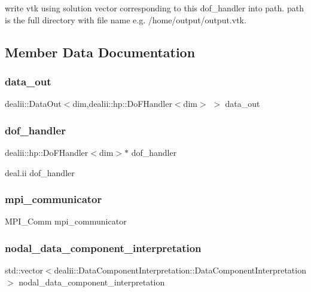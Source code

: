 write vtk using solution vector corresponding to this dof\+\_\+handler into path. path is the full directory with file name e.\+g. \textquotesingle{}/home/output/output.vtk\textquotesingle{}. 

\subsection{Member Data Documentation}
\mbox{\label{class_f_e_mdata_ab8d2ee01f13a0a7b7d2dd50edabbe8b6}} 
\subsubsection{\texorpdfstring{data\+\_\+out}{data\_out}}
{\footnotesize\ttfamily dealii\+::\+Data\+Out$<$dim,dealii\+::hp\+::\+Do\+F\+Handler$<$dim$>$ $>$ data\+\_\+out}

\mbox{\label{class_f_e_mdata_a38887e3bbeaa16b46355ba99d22e8063}} 
\subsubsection{\texorpdfstring{dof\+\_\+handler}{dof\_handler}}
{\footnotesize\ttfamily dealii\+::hp\+::\+Do\+F\+Handler$<$dim$>$$\ast$ dof\+\_\+handler}

deal.\+ii dof\+\_\+handler \mbox{\label{class_f_e_mdata_a03728ed636ca889ae407c84d181bc611}} 
\subsubsection{\texorpdfstring{mpi\+\_\+communicator}{mpi\_communicator}}
{\footnotesize\ttfamily M\+P\+I\+\_\+\+Comm mpi\+\_\+communicator}

\mbox{\label{class_f_e_mdata_a42965751ff10a28b5add7c0bfa265cee}} 
\subsubsection{\texorpdfstring{nodal\+\_\+data\+\_\+component\+\_\+interpretation}{nodal\_data\_component\_interpretation}}
{\footnotesize\ttfamily std\+::vector$<$dealii\+::\+Data\+Component\+Interpretation\+::\+Data\+Component\+Interpretation$>$ nodal\+\_\+data\+\_\+component\+\_\+interpretation}

